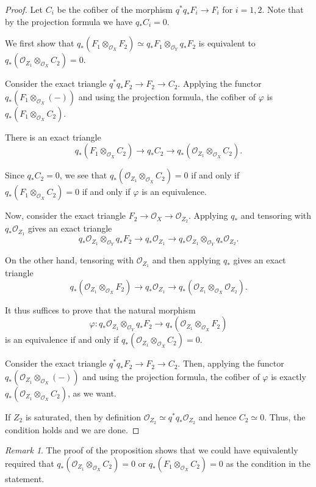 \documentclass[a4paper,twoside,11pt]{amsart}
\theoremstyle{plain}
\theoremstyle{definition}
\theoremstyle{remark}
\newtheorem{remark}[theorem]{Remark}
\numberwithin{equation}{section}
\newcommand{\lr}{\longrightarrow}
\newcommand{\oO}{\mathcal{O}}
\begin{document}
\begin{proof}
    Let $C_i$ be the cofiber of the morphism $q^\ast q_\ast F_i \to F_i$ for $i=1,2$. Note that by the projection formula we have $q_\ast C_i = 0$.
    
    We first show that $q_\ast ( {F_1} \otimes_{\oO_X} {F_2} ) \simeq q_\ast {F_1} \otimes_{\oO_Y} q_\ast {F_2}$ is equivalent to $q_\ast(\oO_{Z_1} \otimes_{\oO_X} C_2) = 0$.

    Consider the exact triangle $q^\ast q_\ast F_2 \to F_2 \to C_2$. Applying the functor $q_\ast(F_1 \otimes_{\oO_X} ( - ) )$ and using the projection formula, the cofiber of $\varphi$ is $q_\ast(F_1 \otimes_{\oO_X} C_2)$.

    There is an exact triangle
    $$q_\ast(F_1 \otimes_{\oO_X} C_2) \lr q_\ast C_2 \lr q_\ast(\oO_{Z_1} \otimes_{\oO_X} C_2).$$

    Since $q_\ast C_2 = 0$, we see that $q_\ast(\oO_{Z_1} \otimes_{\oO_X} C_2) = 0$ if and only if $q_\ast(F_1 \otimes_{\oO_X} C_2) = 0$ if and only if $\varphi$ is an equivalence.
    
    Now, consider the exact triangle $F_2 \to \oO_X \to \oO_{Z_2}$. Applying $q_\ast$ and tensoring with $q_\ast \oO_{Z_1}$ gives an exact triangle
    \[
        q_\ast \oO_{Z_1} \otimes_{\oO_Y} q_\ast F_2 \lr q_\ast \oO_{Z_1} \lr q_*\oO_{Z_1} \otimes_{\oO_Y} q_*\oO_{Z_2}. 
    \]
    
    On the other hand, tensoring with $\oO_{Z_1}$ and then applying $q_\ast$ gives an exact triangle
    \[
        q_\ast (\oO_{Z_1} \otimes_{\oO_X}  F_2) \lr q_\ast \oO_{Z_1} \lr q_*(\oO_{Z_1} \otimes_{\oO_X} \oO_{Z_2}). 
    \]

    It thus suffices to prove that the natural morphism 
    \[
    \varphi \colon q_\ast \oO_{Z_1} \otimes_{\oO_Y} q_\ast F_2 \lr q_\ast (\oO_{Z_1} \otimes_{\oO_X}  F_2) 
    \]
    is an equivalence if and only if $q_\ast(\oO_{Z_1} \otimes_{\oO_X} C_2) = 0$.

    Consider the exact triangle $q^\ast q_\ast F_2 \to F_2 \to C_2$. Then, applying the functor $q_\ast(\oO_{Z_1} \otimes_{\oO_X} ( - ) )$ and using the projection formula, the cofiber of $\varphi$ is exactly $q_\ast(\oO_{Z_1} \otimes_{\oO_X} C_2)$, as we want.

    If $Z_2$ is saturated, then by definition $\oO_{Z_2} \simeq q^*q_*\oO_{Z_2}$ and hence $C_2 \simeq 0$. Thus, the condition holds and we are done.
\end{proof}

\begin{remark}
    The proof of the proposition shows that we could have equivalently required that $q_\ast(\oO_{Z_1} \otimes_{\oO_X} C_2) = 0$ or $q_\ast(F_1 \otimes_{\oO_X} C_2) = 0$ as the condition in the statement.
\end{remark}
\end{document}
